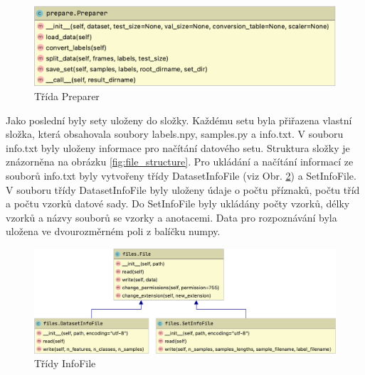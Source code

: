 \documentclass[FM,BP]{tulthesis}
\begin{document}
\begin{figure}[h]
\centerline{\includegraphics[scale=.25,keepaspectratio]{prepare.png}}
\caption{Třída Preparer}
\label{fig:preparer}
\end{figure}
\FloatBarrier

Jako poslední byly sety uloženy do složky. Každému setu byla přiřazena vlastní složka, která obsahovala soubory labels.npy, samples.py a info.txt. V souboru info.txt byly uloženy informace pro načítání datového setu. Struktura složky je znázorněna na obrázku \ref{fig:file_structure}. Pro ukládání a načítání informací ze souborů info.txt byly vytvořeny třídy DatasetInfoFile (viz Obr. \ref{fig:info_files}) a SetInfoFile. V souboru třídy DatasetInfoFile byly uloženy údaje o počtu příznaků, počtu tříd a počtu vzorků datové sady. Do SetInfoFile byly ukládány počty vzorků, délky vzorků a názvy souborů se vzorky a anotacemi. Data pro rozpoznávání byla uložena ve dvourozměrném poli z balíčku numpy.

\begin{figure}[h]
\centerline{\includegraphics[scale=.25]{files-info.png}}
\caption{Třídy InfoFile}
\label{fig:info_files}
\end{figure}
\FloatBarrier
\end{document}
